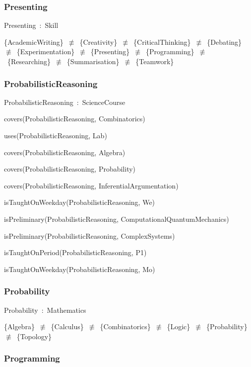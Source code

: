 \documentclass{article}
\begin{document}
\subsubsection*{Presenting}

Presenting~:~Skill

\{AcademicWriting\}~\ensuremath{\not\equiv}~\{Creativity\}~\ensuremath{\not\equiv}~\{CriticalThinking\}~\ensuremath{\not\equiv}~\{Debating\}~\ensuremath{\not\equiv}~\{Experimentation\}~\ensuremath{\not\equiv}~\{Presenting\}~\ensuremath{\not\equiv}~\{Programming\}~\ensuremath{\not\equiv}~\{Researching\}~\ensuremath{\not\equiv}~\{Summarisation\}~\ensuremath{\not\equiv}~\{Teamwork\}

\subsubsection*{ProbabilisticReasoning}

ProbabilisticReasoning~:~ScienceCourse

covers(ProbabilisticReasoning, Combinatorics)

uses(ProbabilisticReasoning, Lab)

covers(ProbabilisticReasoning, Algebra)

covers(ProbabilisticReasoning, Probability)

covers(ProbabilisticReasoning, InferentialArgumentation)

isTaughtOnWeekday(ProbabilisticReasoning, We)

isPreliminary(ProbabilisticReasoning, ComputationalQuantumMechanics)

isPreliminary(ProbabilisticReasoning, ComplexSystems)

isTaughtOnPeriod(ProbabilisticReasoning, P1)

isTaughtOnWeekday(ProbabilisticReasoning, Mo)

\subsubsection*{Probability}

Probability~:~Mathematics

\{Algebra\}~\ensuremath{\not\equiv}~\{Calculus\}~\ensuremath{\not\equiv}~\{Combinatorics\}~\ensuremath{\not\equiv}~\{Logic\}~\ensuremath{\not\equiv}~\{Probability\}~\ensuremath{\not\equiv}~\{Topology\}

\subsubsection*{Programming}
\end{document}
